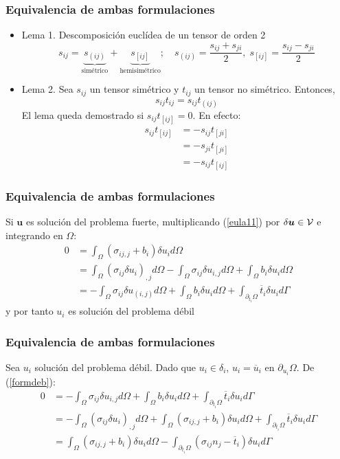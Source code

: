 \documentclass{beamer}
\begin{document}
\begin{frame}
\frametitle{Equivalencia de ambas formulaciones}
\begin{itemize}
\item Lema 1. Descomposición euclídea de un tensor de orden 2
\begin{equation*}
s_{ij}=\underbrace{s_{(ij)}}_{\textrm{simétrico}}+
       \underbrace{s_{[ij]}}_{\textrm{hemisimétrico}};
\quad
s_{(ij)}=\frac{s_{ij}+s_{ji}}{2},
\;
s_{[ij]}=\frac{s_{ij}-s_{ji}}{2}
\end{equation*}
\item Lema 2. Sea $s_{ij}$ un tensor simétrico y $t_{ij}$ un tensor no 
simétrico. Entonces,
$$
s_{ij} t_{ij}=s_{ij} t_{(ij)}
$$
El lema queda demostrado si $s_{ij} t_{[ij]}=0$. En efecto:
\begin{align*}
s_{ij} t_{[ij]}&=-s_{ij} t_{[ji]} \\
\mbox{}        &=-s_{ji} t_{[ji]} \\
\mbox{}        &=-s_{ij} t_{[ij]}
\end{align*}
\end{itemize}
\end{frame}
\begin{frame}
\frametitle{Equivalencia de ambas formulaciones}
Si $\bm{u}$ es solución del problema fuerte, 
multiplicando (\ref{eula11}) por $\delta \bm{u} \in {\cal V}$ e integrando en
$\Omega$:
\begin{align}
0&= \int_{\Omega} (\sigma_{ij,j}+b_i)\delta u_i d\Omega \nonumber \\
 &= \int_{\Omega} (\sigma_{ij}\delta u_i)_{,j} d \Omega -
    \int_{\Omega}  \sigma_{ij}\delta u_{i,j} d \Omega +  
    \int_{\Omega} b_i \delta u_i d\Omega \nonumber \\
 &=-\int_{\Omega} \sigma_{ij}\delta u_{(i,j)} d \Omega +
    \int_{\Omega}  b_i \delta u_i d\Omega + 
    \int_{\partial_{t_i}\Omega}  \overline{t}_i \delta u_i d \Gamma
\end{align}
y por tanto $u_i$ es solución del problema débil
\end{frame}
\begin{frame}
\frametitle{Equivalencia de ambas formulaciones}
Sea $u_i$ solución del problema débil. Dado que $u_i \in \delta_i$, $u_i=
\overline{u}_i$ en $\partial_{u_i} \Omega$. De (\ref{formdeb}):
\begin{align}
0&=-\int_{\Omega} \sigma_{ij}\delta u_{i,j} d \Omega +
  \int_{\Omega}  b_i \delta u_i d\Omega +
  \int_{\partial_{t_i}\Omega}  \overline{t}_i \delta u_i d \Gamma \nonumber \\
 &=-\int_{\Omega} (\sigma_{ij}\delta u_i)_{,j} d \Omega +
  \int_{\Omega} (\sigma_{ij,j}+b_i)\delta u_i d \Omega +
  \int_{\partial_{t_i}\Omega}  \overline{t}_i \delta u_i d \Gamma \nonumber \\
 &= \int_{\Omega} (\sigma_{ij,j}+b_i)\delta u_i d \Omega -
  \int_{\partial_{t_i}\Omega}(\sigma_{ij}n_j-\overline{t}_i)\delta u_i d \Gamma
\label{demoeq}
\end{align}
\end{frame}
\end{document}
